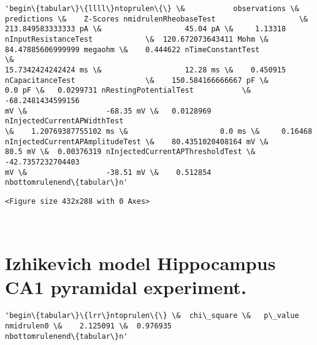             \begin{tcolorbox}[breakable, size=fbox, boxrule=.5pt, pad at break*=1mm, opacityfill=0]
\begin{Verbatim}[commandchars=\\\{\}]
'begin\{tabular\}\{llll\}ntoprulen\{\} \&           observations \&
predictions \&    Z-Scores nmidrulenRheobaseTest                   \&
213.849583333333 pA \&                   45.04 pA \&     1.13318
nInputResistanceTest            \&  120.672073643411 Mohm \&
84.47885606999999 megaohm \&    0.444622 nTimeConstantTest               \&
15.7342424242424 ms \&                   12.28 ms \&    0.450915
nCapacitanceTest                \&    150.584166666667 pF \&
0.0 pF \&   0.0299731 nRestingPotentialTest           \&   -68.2481434599156
mV \&                  -68.35 mV \&   0.0128969 nInjectedCurrentAPWidthTest
\&    1.20769387755102 ms \&                     0.0 ms \&     0.16468
nInjectedCurrentAPAmplitudeTest \&    80.4351020408164 mV \&
80.5 mV \&  0.00376319 nInjectedCurrentAPThresholdTest \&   -42.7357232704403
mV \&                  -38.51 mV \&    0.512854
nbottomrulenend\{tabular\}n'
\end{Verbatim}
\end{tcolorbox}
        
    
    \begin{verbatim}
<Figure size 432x288 with 0 Axes>
    \end{verbatim}

    
    \begin{center}
    \end{center}
    { \hspace*{\fill} \\}
    
    \hypertarget{izhikevich-model-hippocampus-ca1-pyramidal-experiment.}{%
\section{Izhikevich model Hippocampus CA1 pyramidal
experiment.}\label{izhikevich-model-hippocampus-ca1-pyramidal-experiment.}}

            \begin{tcolorbox}[breakable, size=fbox, boxrule=.5pt, pad at break*=1mm, opacityfill=0]
\begin{Verbatim}[commandchars=\\\{\}]
'begin\{tabular\}\{lrr\}ntoprulen\{\} \&  chi\_square \&   p\_value
nmidrulen0 \&    2.125091 \&  0.976935
nbottomrulenend\{tabular\}n'
\end{Verbatim}
\end{tcolorbox}
        
